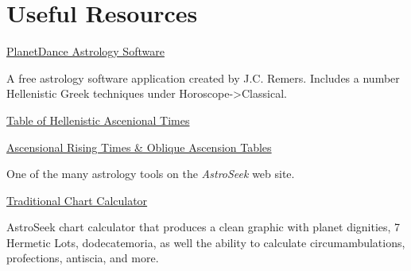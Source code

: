 \section{Useful Resources}

\noindent\href{https://www.jcremers.com/}{PlanetDance Astrology Software}

	A free astrology software application created by J.C. Remers. Includes a number Hellenistic Greek techniques under Horoscope->Classical.

\noindent\href{http://www.projecthindsight.com/images/TablesPDFs/Tb2-AscT-sysAB.pdf}{Table of Hellenistic Ascenional Times}
	
	\noindent\href{https://horoscopes.astro-seek.com/calculate-ascensional-rising-times/?latitude=&narozeni_lat_custom_stupne=0&narozeni_lat_custom_minuty=0&narozeni_lat_custom_smer=0&narozeni_rok=2022&aya=&oa=&decimal=0}{Ascensional Rising Times \& Oblique Ascension Tables}
	
	One of the many astrology tools on the \textsl{AstroSeek} web site.
	
	\noindent\href{https://horoscopes.astro-seek.com/traditional-astrology}{Traditional Chart Calculator}
	
	AstroSeek chart calculator that produces a clean graphic with planet dignities, 7 Hermetic Lots, dodecatemoria, as well the ability to calculate circumambulations, profections, antiscia, and more.
	
\newpage
